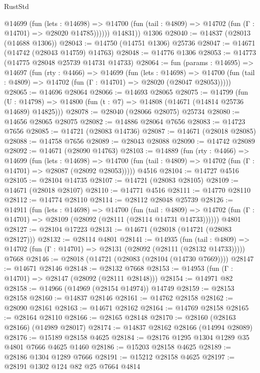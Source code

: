 \begin{lexlean}{RustStd}
\begin{coremodule}
            @14699
              (fun (lets : @14698) =>
              @14700 (fun (tail : @4809) => @14702 (fun (Γ : @14701) => @28020 @14785))))))
        @14831))
    @1306
@28040 := @14837 (@28013 (@14688 @1306))
@28043 := @14750 (@14751 @1306) @25736
@28047 := @14671 (@14742 (@28043 @14759) @14763)
@28048 := @14776 @1306
@28053 := @14773 (@14775 @28048 @25739 @14731 @14733)
@28064 := fun (params : @14695) =>
  @14697
    (fun (rty : @4466) =>
    @14699
      (fun (lets : @14698) =>
      @14700 (fun (tail : @4809) => @14702 (fun (Γ : @14701) => @28020 (@28047 @28053)))))
@28065 := @14696 @28064
@28066 := @14693 @28065
@28075 := @14799
    (fun (U : @14798) => @14800 (fun (t : @7) => @14808 (@14671 (@14814 @25736 @14689) @14825)))
@28078 := @28040 (@28066 @28075) @25734
@28080 := @14656 @28065 @28075
@28082 := @14886 @28064 @7656
@28083 := @14723 @7656
@28085 := @14721 (@28083 @14736)
@28087 := @14671 (@28018 @28085)
@28088 := @14758 @7656
@28089 := @28043 @28088
@28090 := @14742 @28089
@28092 := @14671 (@28090 @14763)
@28103 := @14889
    (fun (rty : @4466) =>
    @14699
      (fun (lets : @14698) =>
      @14700 (fun (tail : @4809) => @14702 (fun (Γ : @14701) => @28087 (@28092 @28053)))))
    @4516
@28104 := @14727 @4516
@28105 := @28104 @14735
@28107 := @14721 (@28083 @28105)
@28109 := @14671 (@28018 @28107)
@28110 := @14771 @4516
@28111 := @14770 @28110
@28112 := @14774 @28110
@28114 := @28112 @28048 @25739
@28126 := @14911
    (fun (lets : @14698) =>
    @14700
      (fun (tail : @4809) =>
      @14702 (fun (Γ : @14701) => @28109 (@28092 (@28111 (@28114 @14731 @14733))))))
    @4801
@28127 := @28104 @17223
@28131 := @14671 (@28018 (@14721 (@28083 @28127)))
@28132 := @28114 @4801
@28141 := @14935
    (fun (tail : @4809) => @14702 (fun (Γ : @14701) => @28131 (@28092 (@28111 (@28132 @14733)))))
    @7668
@28146 := @28018 (@14721 (@28083 (@28104 (@14730 @7669))))
@28147 := @14671 @28146
@28148 := @28132 @7668
@28153 := @14953 (fun (Γ : @14701) => @28147 (@28092 (@28111 @28148)))
@28154 := @14971 @82
@28158 := @14966 (@14969 (@28154 @14974)) @14749
@28159 := @28153 @28158
@28160 := @14837 @28146
@28161 := @14762 @28158
@28162 := @28090 @28161
@28163 := @14671 @28162
@28164 := @14769 @28158
@28165 := @28164 @28110
@28166 := @28165 @28148
@28170 := @28160 (@28163 @28166) (@14989 @28017)
@28174 := @14837 @28162 @28166 (@14994 @28089)
@28176 := @15189 @28158 @4625
@28184 := @28176 @1295 @1304 @1289 @35 @4801 @7666 @4625 @1460
@28186 := @15203 @28158 @4625
@28189 := @28186 @1304 @1289 @7666
@28191 := @15212 @28158 @4625
@28197 := @28191 @1302 @124 @82 @25 @7664 @4814

\end{coremodule}
\end{lexlean}
